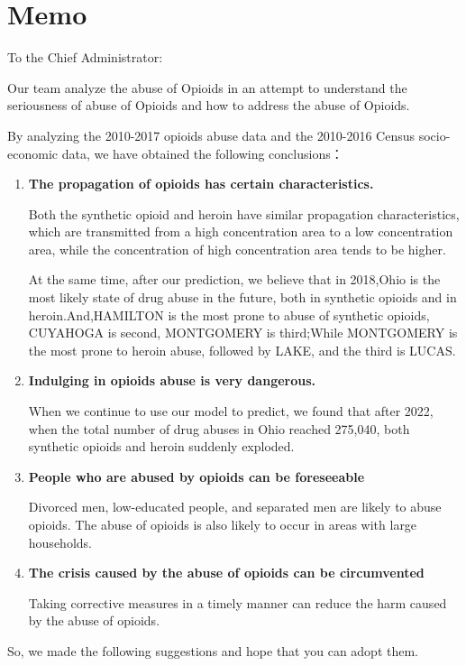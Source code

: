 \documentclass[12pt]{mcmthesis}
\begin{document}
\section{Memo}
To the Chief Administrator:\par
Our team analyze the abuse of Opioids in an attempt to understand the seriousness of abuse of Opioids and how to address the abuse of Opioids.\par
By analyzing the 2010-2017 opioids abuse data and the 2010-2016 Census socio-economic data, we have obtained the following conclusions：
\begin{enumerate}
  \item \textbf{The propagation of opioids has certain characteristics.}\par Both the synthetic opioid and heroin have similar propagation characteristics, which are transmitted from a high concentration area to a low concentration area, while the concentration of high concentration area tends to be higher.\par At the same time, after our prediction, we believe that in 2018,Ohio is the most likely state of drug abuse in the future, both in synthetic opioids and in heroin.And,HAMILTON is the most prone to abuse of synthetic opioids, CUYAHOGA is second, MONTGOMERY is third;While MONTGOMERY is the most prone to heroin abuse, followed by LAKE, and the third is LUCAS.
\item \textbf{Indulging in opioids abuse is very dangerous.}\par When we continue to use our model to predict, we found that after 2022, when the total number of drug abuses in Ohio reached 275,040, both synthetic opioids and heroin suddenly exploded.
  \item \textbf{People who are abused by opioids can be foreseeable}\par Divorced men, low-educated people, and separated men are likely to abuse opioids. The abuse of opioids is also likely to occur in areas with large households.
  \item \textbf{The crisis caused by the abuse of opioids can be circumvented}\par Taking corrective measures in a timely manner can reduce the harm caused by the abuse of opioids.
\end{enumerate}
So, we made the following suggestions and hope that you can adopt them.\par
\end{document}
